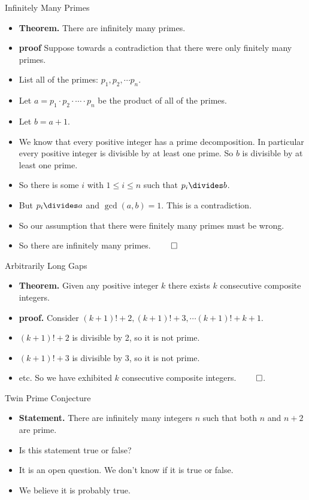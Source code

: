 \documentclass[handout]{beamer}
\begin{document}
\begin{frame}{Infinitely Many Primes}

\begin{itemize}
  \item \textbf{Theorem.} There are infinitely many primes.
  \item \textbf{proof} Suppose towards a contradiction that there were only finitely many primes.
  \item List all of the primes: $p_1, p_2,  \cdots p_n$.
  \item Let $a = p_1 \cdot p_2 \cdot \cdots \cdot p_n$ be the product of all of the primes.
  \item Let $b=a+1$.
  \item We know that every positive integer has a prime decomposition. In particular every positive
  integer is divisible by at least one prime. So $b$ is divisible by at least one prime.
  \item So there is some $i$ with $1\leq i\leq n$ such that $p_i \divides b$.
  \item But $p_i \divides a$ and $\gcd(a,b)=1$. This is a contradiction.
  \item So our assumption that there were finitely many primes must be wrong.
  \item So there are infinitely many primes. $\qed$
\end{itemize}

\end{frame}

\begin{frame}{Arbitrarily Long Gaps}

\begin{itemize}
  \item \textbf{Theorem.} Given any positive integer $k$ there exists $k$
  consecutive composite integers.
  \item \textbf{proof.} Consider $(k+1)! + 2, (k+1)! + 3, \cdots (k+1)! + k + 1$.
  \item $(k+1)! + 2$ is divisible by 2, so it is not prime.
  \item $(k+1)! + 3$ is divisible by 3, so it is not prime.
  \item etc. So we have exhibited $k$ consecutive composite integers. $\qed$.
\end{itemize}

\end{frame}

\begin{frame}{Twin Prime Conjecture}

\begin{itemize}
  \item \textbf{Statement.} There are infinitely many integers $n$ such that
  both $n$ and $n+2$ are prime.
  \item Is this statement true or false?
  \item It is an open question. We don't know if it is true or false.
  \item We believe it is probably true.
\end{itemize}

\end{frame}
\end{document}
